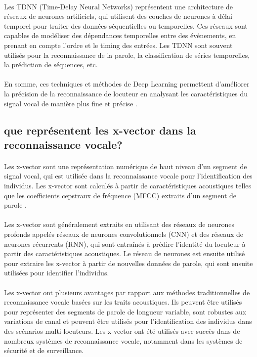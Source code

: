 \paragraph{}Les TDNN (Time-Delay Neural Networks) représentent une architecture de réseaux de neurones artificiels, qui utilisent des couches de neurones à délai temporel pour traiter des données séquentielles ou temporelles. Ces réseaux sont capables de modéliser des dépendances temporelles entre des événements, en prenant en compte l'ordre et le timing des entrées. Les TDNN sont souvent utilisés pour la reconnaissance de la parole, la classification de séries temporelles, la prédiction de séquences, etc.
\paragraph{}En somme, ces techniques et méthodes de Deep Learning permettent d'améliorer la précision de la reconnaissance de locuteur en analysant les caractéristiques du signal vocal de manière plus fine et précise \cite{tdnn}.

\subsection{que représentent les x-vector dans la reconnaissance vocale?}
\paragraph{}Les x-vector sont une représentation numérique de haut niveau d'un segment de signal vocal, qui est utilisée dans la reconnaissance vocale pour l'identification des individus. Les x-vector sont calculés à partir de caractéristiques acoustiques telles que les coefficients cepstraux de fréquence (MFCC) extraits d'un segment de parole \cite{xvectors}.	
\paragraph{}Les x-vector sont généralement extraits en utilisant des réseaux de neurones profonds appelés réseaux de neurones convolutionnels (CNN) et des réseaux de neurones récurrents (RNN), qui sont entraînés à prédire l'identité du locuteur à partir des caractéristiques acoustiques. Le réseau de neurones est ensuite utilisé pour extraire les x-vector à partir de nouvelles données de parole, qui sont ensuite utilisées pour identifier l’individus.
\paragraph{}Les x-vector ont plusieurs avantages par rapport aux méthodes traditionnelles de reconnaissance vocale basées sur les traits acoustiques. Ils peuvent être utilisés pour représenter des segments de parole de longueur variable, sont robustes aux variations de canal et peuvent être utilisés pour l'identification des individus dans des scénarios multi-locuteurs. Les x-vector ont été utilisés avec succès dans de nombreux systèmes de reconnaissance vocale, notamment dans les systèmes de sécurité et de surveillance.

